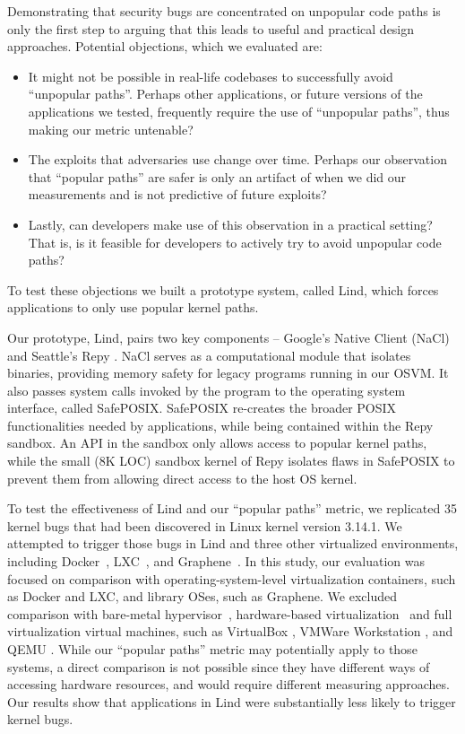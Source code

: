 Demonstrating that security bugs are concentrated on unpopular
code paths is only the first step to arguing that this leads to useful and
practical design approaches.  Potential objections, which we evaluated are:
\begin{itemize}
\item It might not be possible in real-life codebases to successfully avoid ``unpopular paths''. 
Perhaps other applications, or future versions of the applications we tested, frequently require the use of ``unpopular paths'', thus making our metric untenable?
\item The exploits that adversaries use change over time. 
Perhaps our observation that ``popular paths'' are safer is only an artifact of when we did our measurements and is not predictive of future exploits?
\item Lastly, can developers make use of this observation in a practical setting?  That is, is it feasible for developers to actively try to avoid unpopular code paths?
\end{itemize}
To test these objections we built a prototype system, called Lind, which forces applications
to only use popular kernel paths.

Our prototype, Lind, pairs two key components -- Google's Native Client
(NaCl) \cite{NaCl-09} and Seattle's Repy \cite{Repy-10}.
NaCl serves as a computational module that isolates
binaries, providing memory safety for legacy programs running in our OSVM.
It also passes system calls invoked by the program to the operating system interface, called SafePOSIX.
SafePOSIX re-creates the broader POSIX functionalities needed by applications, while being contained within the Repy sandbox. 
An API in the sandbox only allows access to popular kernel paths, while
the small (8K LOC) sandbox kernel of Repy isolates flaws in SafePOSIX
to prevent them from allowing direct access to the host OS kernel.

To test the effectiveness of Lind and our ``popular paths'' metric, 
we replicated 35 kernel bugs that had been
discovered in Linux kernel version 3.14.1.  We attempted to trigger those
bugs in Lind and three other virtualized environments,
including Docker~\cite{Docker}, LXC~\cite{LXC}, and Graphene~\cite{Graphene-14}. 
In this study, our evaluation was focused on comparison with operating-system-level virtualization containers, such as Docker and LXC, 
and library OSes, such as Graphene. 
We excluded comparison with bare-metal hypervisor~\cite{Xen-03, VMWare-Server}, 
hardware-based virtualization~\cite{IntelVT, keller2010nohype} and full virtualization 
virtual machines, such as VirtualBox \cite{VirtualBox}, VMWare Workstation \cite{VMWare-Workstation}, and QEMU \cite{QEMU}. 
While our ``popular paths'' metric may potentially apply to those
systems, a direct comparison is not possible since they have different 
ways of accessing hardware resources, and would require different measuring approaches.
Our results show that applications in Lind were substantially less likely to trigger
kernel bugs.


